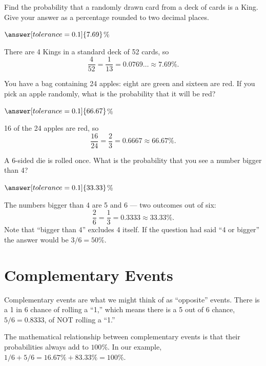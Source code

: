\documentclass[12pt]{ximera}
\begin{document}
\begin{problem}
Find the probability that a randomly drawn card from a deck of cards is a King. Give
your answer as a percentage rounded to two decimal places.

$\answer[tolerance=0.1]{7.69}$\%

\begin{solution}
There are 4 Kings in a standard deck of 52 cards, so
\[
\frac{4}{52} = \frac{1}{13} = 0.0769\ldots \approx 7.69\%.
\]
\end{solution}
\end{problem}

\begin{problem}
You have a bag containing 24 apples: eight are green and sixteen are red. If you pick an
apple randomly, what is the probability that it will be red?

$\answer[tolerance=0.1]{66.67}$\%

\begin{solution}
16 of the 24 apples are red, so
\[
\frac{16}{24} = \frac{2}{3} = 0.6667 \approx 66.67\%.
\]
\end{solution}
\end{problem}

\begin{problem}
A 6-sided die is rolled once. What is the probability that you see a number bigger than
4?

$\answer[tolerance=0.1]{33.33}$\%

\begin{solution}
The numbers bigger than 4 are 5 and 6 --- two outcomes out of six:
\[
\frac{2}{6} = \frac{1}{3} = 0.3333 \approx 33.33\%.
\]
Note that ``bigger than 4'' excludes 4 itself. If the question had said ``4 or bigger''
the answer would be $3/6 = 50\%$.
\end{solution}
\end{problem}

\section*{Complementary Events}

Complementary events are what we might think of as ``opposite'' events. There is a 1 in
6 chance of rolling a ``1,'' which means there is a 5 out of 6 chance, $5/6 = 0.8333$, of
NOT rolling a ``1.''

The mathematical relationship between complementary events is that their probabilities
always add to $100\%$. In our example, $1/6 + 5/6 = 16.67\% + 83.33\% = 100\%$.
\end{document}
